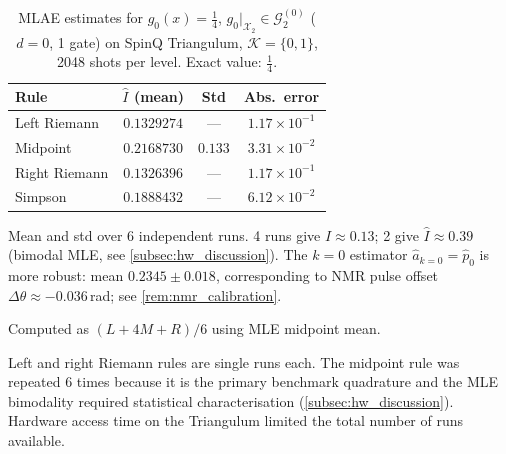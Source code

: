 \documentclass[12pt,a4paper]{article}
\theoremstyle{plain}
\theoremstyle{definition}
\theoremstyle{remark}
\newcommand{\Gclass}[2]{\mathcal{G}_{#1}^{(#2)}}
\begin{document}
\begin{table}[h]
\centering
\caption{MLAE estimates for $g_0(x)=\tfrac{1}{4}$, $g_0|_{\mathcal{X}_2}\in\Gclass{2}{0}$
  ($d=0$, 1 gate) on SpinQ Triangulum, $\mathcal{K}=\{0,1\}$,
  2048 shots per level. Exact value: $\tfrac{1}{4}$.}
\label{tab:results_g0_hw}
\begin{threeparttable}
\renewcommand{\arraystretch}{1.3}
\begin{tabular}{lccc}
\toprule
Rule & $\hat{I}$ (mean) & Std & Abs.\ error \\
\midrule
Left Riemann    & $0.1329274$ & ---     & $1.17\times10^{-1}$\tnote{c} \\
Midpoint        & $0.2168730$ & $0.133$\tnote{a} & $3.31\times10^{-2}$ \\
Right Riemann   & $0.1326396$ & ---     & $1.17\times10^{-1}$\tnote{c} \\
Simpson         & $0.1888432$ & ---     & $6.12\times10^{-2}$\tnote{b} \\
\bottomrule
\end{tabular}
\begin{tablenotes}
\footnotesize
\item[a] Mean and std over 6 independent runs.
  4 runs give $\hat{I}\approx 0.13$; 2 give $\hat{I}\approx 0.39$
  (bimodal MLE, see \cref{subsec:hw_discussion}).
  The $k=0$ estimator $\hat{a}_{k=0}=\hat{p}_0$ is more robust:
  mean $0.2345\pm0.018$, corresponding to NMR pulse offset
  $\Delta\theta\approx-0.036$\,rad; see \cref{rem:nmr_calibration}.
\item[b] Computed as $(L+4M+R)/6$ using MLE midpoint mean.
\item[c] Left and right Riemann rules are single runs each.
  The midpoint rule was repeated 6 times because it is the primary
  benchmark quadrature and the MLE bimodality required statistical
  characterisation (\cref{subsec:hw_discussion}).
  Hardware access time on the Triangulum limited the total number
  of runs available.
\end{tablenotes}
\end{threeparttable}
\end{table}
\end{document}
